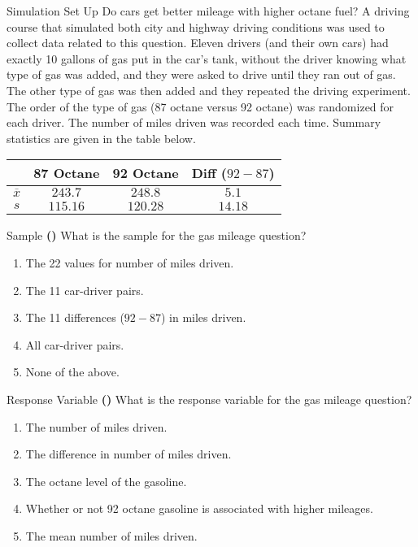 \documentclass[13pt]{beamer}
\newcounter{count}
\newcommand{\question}{ \textbf{(\decimal{count})} \stepcounter{count}}
\newenvironment{click}{\begin{enumerate}[A]}{\end{enumerate}}
\begin{document}
\begin{frame}{Simulation Set Up}
Do cars get better mileage with higher octane fuel? A driving course that simulated both city and highway driving conditions was used to collect data related to this question. Eleven drivers (and their own cars) had exactly 10 gallons of gas put in the car's tank, without the driver knowing what type of gas was added, and they were asked to drive until they ran out of gas. The other type of gas was then added and they repeated the driving experiment. The order of the type of gas (87 octane versus 92 octane) was randomized for each driver. The number of miles driven was recorded each time. Summary statistics are given in the table below.
\begin{center}
\begin{tabular}{| c | c | c | c|}
\hline
& 87 Octane           & 92 Octane  & Diff ($92-87$)\\ \hline \hline
$\overline{x}$     & $243.7$  & $248.8$   & $5.1$  \\ \hline
$s$ & $115.16$  & $120.28$   & $14.18$  \\ \hline
\end{tabular}
\end{center}
\end{frame}

\begin{frame}{Sample}
\question What is the sample for the gas mileage question?
\begin{click}
   \item The 22 values for number of miles driven.
   \item The 11 car-driver pairs.%
   \item The 11 differences ($92 - 87$) in miles driven.
   \item All car-driver pairs.
   \item None of the above.
\end{click}
\end{frame}

\begin{frame}{Response Variable}
\question What is the response variable for the gas mileage question?
\begin{click}
   \item The number of miles driven.%
   \item The difference in number of miles driven.
   \item The octane level of the gasoline.
   \item Whether or not 92 octane gasoline is associated with higher mileages.
  \item The mean number of miles driven.
\end{click}
\end{frame}
\end{document}
